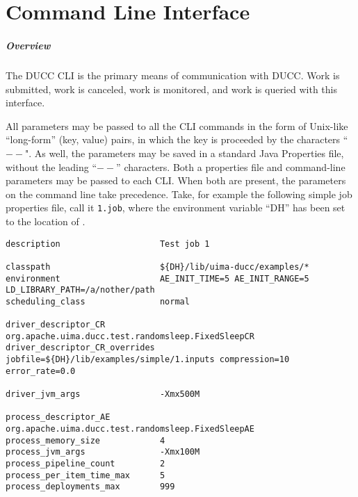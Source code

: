 % 
% 
% 
% 
\ifpdf
\else
{}
\fi
\chapter{Command Line Interface}
\label{chap:cli}

    \paragraph{Overview}
    The DUCC CLI is the primary means of communication with DUCC.  Work is submitted, work is
    canceled, work is monitored, and work is queried with this interface.

    All parameters may be passed to all the CLI commands in the form of Unix-like ``long-form''
    (key, value) pairs, in which the key is proceeded by the characters ``$--$".  As well, the
    parameters may be saved in a standard Java Properties file, without the leading ``$--$''
    characters.  Both a properties file and command-line parameters may be passed to each CLI.  When
    both are present, the parameters on the command line take precedence.  Take, for example
    the following simple job properties file, call it {\tt 1.job}, where the environment variable
    ``DH'' has been set to the location of \ducchome.
\begin{verbatim}
description                    Test job 1

classpath                      ${DH}/lib/uima-ducc/examples/*
environment                    AE_INIT_TIME=5 AE_INIT_RANGE=5 LD_LIBRARY_PATH=/a/nother/path
scheduling_class               normal

driver_descriptor_CR           org.apache.uima.ducc.test.randomsleep.FixedSleepCR
driver_descriptor_CR_overrides jobfile=${DH}/lib/examples/simple/1.inputs compression=10
error_rate=0.0

driver_jvm_args                -Xmx500M

process_descriptor_AE          org.apache.uima.ducc.test.randomsleep.FixedSleepAE
process_memory_size            4
process_jvm_args               -Xmx100M 
process_pipeline_count         2
process_per_item_time_max      5
process_deployments_max        999

\end{verbatim}

